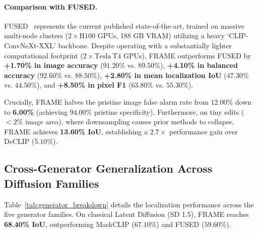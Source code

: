 \paragraph{Comparison with FUSED.} FUSED~\cite{fused} represents the current published state-of-the-art, trained on massive multi-node clusters ($2 \times \mathrm{H}100$ GPUs, 188 GB VRAM) utilizing a heavy `CLIP-ConvNeXt-XXL' backbone. Despite operating with a substantially lighter computational footprint ($2 \times \mathrm{Tesla\ T4}$ GPUs), FRAME outperforms FUSED by \textbf{+1.70\% in image accuracy} ($91.20\%$ vs. $89.50\%$), \textbf{+4.10\% in balanced accuracy} ($92.60\%$ vs. $88.50\%$), \textbf{+2.80\% in mean localization IoU} ($47.30\%$ vs. $44.50\%$), and \textbf{+8.50\% in pixel F1} ($63.80\%$ vs. $55.30\%$). 

Crucially, FRAME halves the pristine image false alarm rate from $12.00\%$ down to \textbf{6.00\%} (achieving $94.00\%$ pristine specificity). Furthermore, on tiny edits ($<2\%$ image area), where downsampling causes prior methods to collapse, FRAME achieves \textbf{13.60\% IoU}, establishing a $2.7\times$ performance gain over DeCLIP ($5.10\%$).

\subsection{Cross-Generator Generalization Across Diffusion Families}
Table~\ref{tab:generator_breakdown} details the localization performance across the five generator families. On classical Latent Diffusion (SD 1.5), FRAME reaches \textbf{68.40\% IoU}, outperforming MaskCLIP ($67.10\%$) and FUSED ($59.60\%$).

\begin{table}[t]
\centering\small
\caption{Cross-generator localization performance (mIoU, \%) across five diffusion architectures on the OpenSDID benchmark.}
\label{tab:generator_breakdown}
\end{table}


